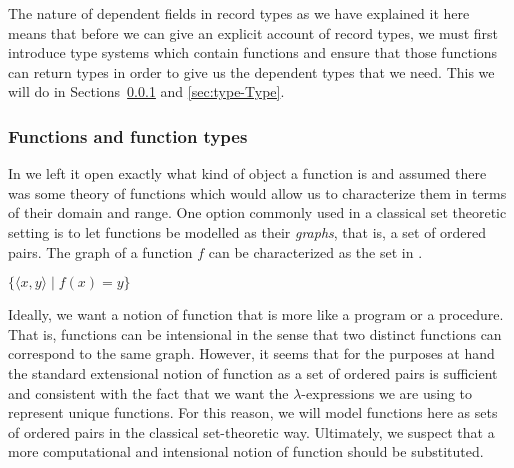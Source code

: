The nature of dependent fields in record types as we have explained it
here means that before we can give an explicit account of record types,
we must first introduce type systems which contain
functions and ensure that those functions can return types in order to
give us the dependent types that we need.  This we will do in
Sections~\ref{sec:funs} and \ref{sec:type-Type}.



\subsubsection{Functions and function types}
\label{sec:funs} 

In \cite{Cooper2012} we left it open exactly what kind of object a
function is and assumed there was some theory of functions which would
allow us to characterize them in terms of their domain and range.  One
option commonly used in
a classical set theoretic setting is to let functions be modelled as
their \textit{graphs}, that is, a set of ordered pairs.  The graph of
a function $f$ can be characterized as the set in \nexteg{}.
\begin{ex} 
$\{\langle x,y\rangle\mid f(x)=y\}$ 
\end{ex} 
Ideally, we want a notion of function
that is more like a program or a procedure.  That is, functions can be
intensional in the sense that two distinct functions can correspond to
the same graph. However, it seems that for the purposes
at hand the standard extensional notion of function as a set of
ordered pairs is sufficient and consistent with the fact that we want
the $\lambda$-expressions we are using to represent unique functions.  For this
reason, we will model functions here as sets of ordered pairs in the
classical set-theoretic way.  Ultimately, we suspect that a more
computational and intensional notion of function should be
substituted.

